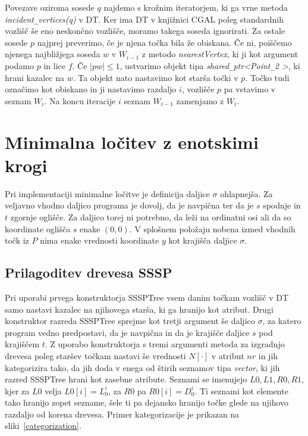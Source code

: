 \documentclass[a4paper, 12pt]{book}
\newcommand{\U}{\texttt{\_}}
\begin{document}
Povezave oziroma sosede $q$ najdemo s krožnim iteratorjem, ki ga vrne metoda \textit{incident\U vertices(q)} v DT. Ker ima DT v knjižnici CGAL poleg standardnih vozlišč še eno neskončno vozlišče, moramo takega soseda ignorirati. Za ostale sosede $p$ najprej preverimo, če je njena točka bila že obiskana. Če ni, poiščemo njenega najbližjega soseda $w$ v $W_{i-1}$ z metodo \textit{nearestVertex}, ki ji kot argument podamo $p$ in lice $f$. Če $|pw|\le 1$, ustvarimo objekt tipa \textit{shared\U ptr\textless Point\U 2 \textgreater}, ki hrani kazalec na $w$. Ta objekt nato nastavimo kot starša točki v $p$. Točko tudi označimo kot obiskano in ji nastavimo razdaljo $i$, vozlišče $p$ pa vstavimo v seznam $W_i$. Na koncu iteracije $i$ seznam $W_{i-1}$ zamenjamo z $W_i$.

\section{Minimalna ločitev z enotskimi krogi}
Pri implementaciji minimalne ločitve je definicija daljice $\sigma$ ohlapnejša. Za veljavno vhodno daljico programa je dovolj, da je navpična ter da je $s$ spodnje in $t$ zgornje oglišče. Za daljico torej ni potrebno, da leži na ordinatni osi ali da so koordinate oglišča $s$ enake $(0, 0)$. V splošnem položaju nobena izmed vhodnih točk iz $P$ nima enake vrednosti koordinate $y$ kot krajišča daljice $\sigma$.
\subsection{Prilagoditev drevesa SSSP}

Pri uporabi prvega konstruktorja SSSPTree vsem danim točkam vozlišč v DT samo nastavi kazalec na njihovega starša, ki ga hranijo kot atribut. Drugi konstruktor razreda SSSPTree sprejme kot tretji argument še daljico $\sigma$, za katero program vedno predpostavi, da je navpična in da je krajišče daljice $s$ pod krajiščem $t$. Z uporabo konstruktorja s tremi argumenti metoda za izgradnjo drevesa poleg staršev točkam nastavi še vrednosti $N[\cdot]$ v atribut $nr$ in jih kategorizira tako, da jih doda v enega od štirih seznamov tipa \textit{vector}, ki jih razred SSSPTree hrani kot zasebne atribute. Seznami se imenujejo $L0, L1, R0, R1$, kjer za $L0$ velja $L0[i] = L_0^i$, za $R0$ pa $R0[i] = D_0^i$. Ti seznami kot elemente tako hranijo zopet sezname, šele ti pa dejansko hranijo točke glede na njihovo razdaljo od korena drevesa. Primer kategorizacije je prikazan na sliki~\ref{categorization}.
\end{document}
